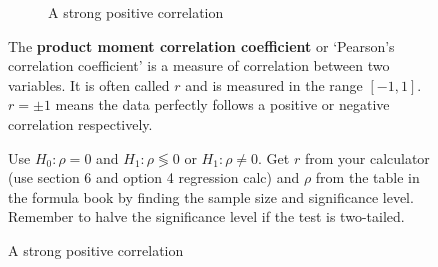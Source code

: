 \documentclass[../main.tex]{subfile}
\begin{document}

\begin{figure}[H]
	\begin{minipage}{0.45\linewidth}
		\begin{figure}[H]
			\centering
			\caption{A strong positive correlation}
		\end{figure}
	\end{minipage}\hfill
	\begin{minipage}{0.5\linewidth}
		The \textbf{product moment correlation coefficient} or \enquote*{Pearson's correlation coefficient} is a measure of correlation between two variables. It is often called $r$ and is measured in the range $[-1, 1]$. $r = \pm 1$ means the data perfectly follows a positive or negative correlation respectively.

		\vspace{5ex}

		Use $H_0: \rho = 0$ and $H_1: \rho \lessgtr 0$ or $H_1: \rho \neq 0$. Get $r$ from your calculator (use section 6 and option 4 regression calc) and $\rho$ from the table in the formula book by finding the sample size and significance level. Remember to halve the significance level if the test is two-tailed.
	\end{minipage}
\end{figure}
\end{document}
